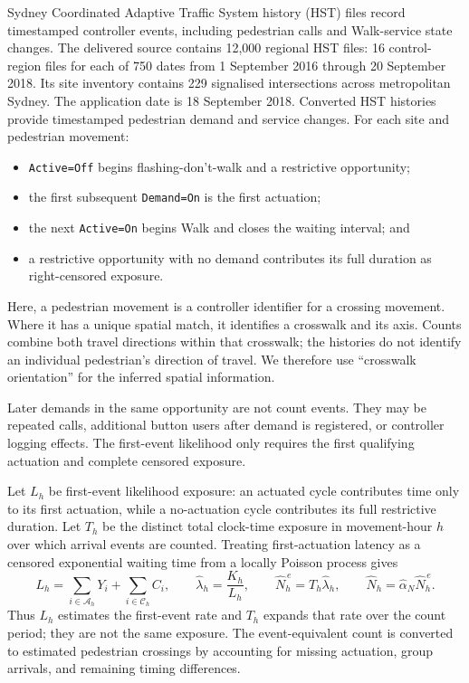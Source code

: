 \documentclass[11pt]{article}
\begin{document}
Sydney Coordinated Adaptive Traffic System history (HST) files record timestamped controller events, including pedestrian calls and Walk-service state changes. The delivered source contains 12,000 regional HST files: 16 control-region files for each of 750 dates from 1 September 2016 through 20 September 2018. Its site inventory contains 229 signalised intersections across metropolitan Sydney. The application date is 18 September 2018. Converted HST histories provide timestamped pedestrian demand and service changes. For each site and pedestrian movement:
\begin{itemize}
  \item \texttt{Active=Off} begins flashing-don't-walk and a restrictive opportunity;
  \item the first subsequent \texttt{Demand=On} is the first actuation;
  \item the next \texttt{Active=On} begins Walk and closes the waiting interval; and
  \item a restrictive opportunity with no demand contributes its full duration as right-censored exposure.
\end{itemize}

Here, a pedestrian movement is a controller identifier for a crossing movement. Where it has a unique spatial match, it identifies a crosswalk and its axis. Counts combine both travel directions within that crosswalk; the histories do not identify an individual pedestrian's direction of travel. We therefore use ``crosswalk orientation'' for the inferred spatial information.

Later demands in the same opportunity are not count events. They may be repeated calls, additional button users after demand is registered, or controller logging effects. The first-event likelihood only requires the first qualifying actuation and complete censored exposure.

Let $L_h$ be first-event likelihood exposure: an actuated cycle contributes time only to its first actuation, while a no-actuation cycle contributes its full restrictive duration. Let $T_h$ be the distinct total clock-time exposure in movement-hour $h$ over which arrival events are counted. Treating first-actuation latency as a censored exponential waiting time from a locally Poisson process gives
\begin{equation}
L_h=\sum_{i\in\mathcal A_h}Y_i+\sum_{i\in\mathcal C_h}C_i,
\qquad
\hat\lambda_h=\frac{K_h}{L_h},
\qquad
\widehat N_h^{\,e}=T_h\widehat\lambda_h,
\qquad
\widehat N_h=\widehat\alpha_N\widehat N_h^{\,e}.
\end{equation}
Thus $L_h$ estimates the first-event rate and $T_h$ expands that rate over the count period; they are not the same exposure. The event-equivalent count is converted to estimated pedestrian crossings by accounting for missing actuation, group arrivals, and remaining timing differences.
\end{document}
